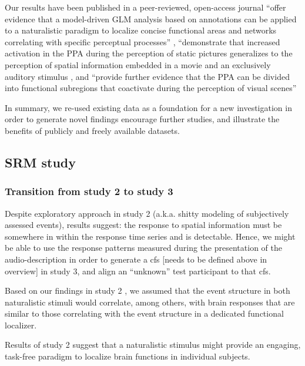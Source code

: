 
Our results have been published in a peer-reviewed, open-access journal
%
``offer evidence that a model-driven GLM analysis based on annotations can be
applied to a naturalistic paradigm to localize concise functional areas and
networks correlating with specific perceptual processes''
\citep{haeusler2022processing},
%
``demonstrate that increased activation in the PPA during the perception of
static pictures generalizes to the perception of spatial information embedded in
a movie and an exclusively auditory stimulus \citep{haeusler2022processing}, and
%
``provide further evidence that the PPA can be divided into functional
subregions that coactivate during the perception of visual scenes''
\citep{haeusler2022processing}

In summary, we re-used existing data as a foundation for a new investigation in
order to generate novel findings encourage further studies, and illustrate the
benefits of publicly and freely available datasets.


\subsection{SRM study}


\subsubsection{Transition from study 2 to study 3}
%
Despite exploratory approach in study 2 (a.k.a. shitty modeling of subjectively
assessed events), results suggest:
%
the response to spatial information must be somewhere in within the response
time series and is detectable.
%
Hence, we might be able to use the response patterns measured during the
presentation of the audio-description in order to generate a \ac{cfs} [needs to
be defined above in overview] in study 3, and align an ``unknown'' test
participant to that \ac{cfs}.

Based on our findings in study 2 \citep{haeusler2022processing}, we assumed that
the event structure in both naturalistic stimuli would correlate, among others,
with brain responses that are similar to those correlating with the event
structure in a dedicated functional localizer.

Results of study 2 suggest that a naturalistic stimulus might provide an
engaging, task-free paradigm to localize brain functions in individual subjects.


